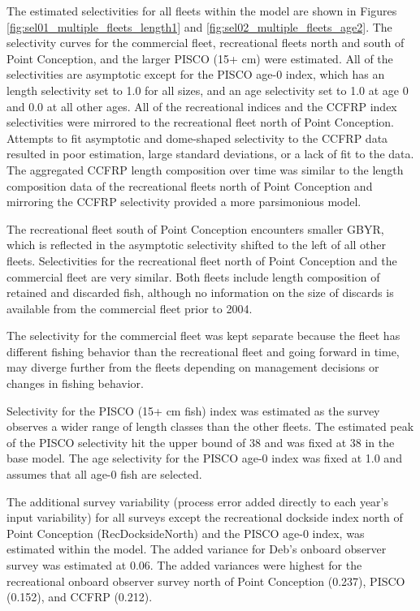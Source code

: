 \documentclass[12pt,]{article}
\begin{document}
The estimated selectivities for all fleets within the model are shown in
Figures \ref{fig:sel01_multiple_fleets_length1} and
\ref{fig:sel02_multiple_fleets_age2}. The selectivity curves for the
commercial fleet, recreational fleets north and south of Point
Conception, and the larger PISCO (15+ cm) were estimated. All of the
selectivities are asymptotic except for the PISCO age-0 index, which has
an length selectivity set to 1.0 for all sizes, and an age selectivity
set to 1.0 at age 0 and 0.0 at all other ages. All of the recreational
indices and the CCFRP index selectivities were mirrored to the
recreational fleet north of Point Conception. Attempts to fit asymptotic
and dome-shaped selectivity to the CCFRP data resulted in poor
estimation, large standard deviations, or a lack of fit to the data. The
aggregated CCFRP length composition over time was similar to the length
composition data of the recreational fleets north of Point Conception
and mirroring the CCFRP selectivity provided a more parsimonious model.

The recreational fleet south of Point Conception encounters smaller
GBYR, which is reflected in the asymptotic selectivity shifted to the
left of all other fleets. Selectivities for the recreational fleet north
of Point Conception and the commercial fleet are very similar. Both
fleets include length composition of retained and discarded fish,
although no information on the size of discards is available from the
commercial fleet prior to 2004.

The selectivity for the commercial fleet was kept separate because the
fleet has different fishing behavior than the recreational fleet and
going forward in time, may diverge further from the fleets depending on
management decisions or changes in fishing behavior.

Selectivity for the PISCO (15+ cm fish) index was estimated as the
survey observes a wider range of length classes than the other fleets.
The estimated peak of the PISCO selectivity hit the upper bound of 38
and was fixed at 38 in the base model. The age selectivity for the PISCO
age-0 index was fixed at 1.0 and assumes that all age-0 fish are
selected.

The additional survey variability (process error added directly to each
year's input variability) for all surveys except the recreational
dockside index north of Point Conception (RecDocksideNorth) and the
PISCO age-0 index, was estimated within the model. The added variance
for Deb's onboard observer survey was estimated at 0.06. The added
variances were highest for the recreational onboard observer survey
north of Point Conception (0.237), PISCO (0.152), and CCFRP (0.212).
\end{document}
